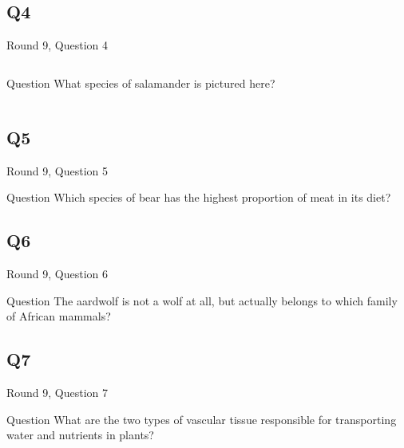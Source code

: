 \documentclass[11pt]{beamer}
\begin{document}
\subsection*{Q4}
\begin{frame}[t]{Round 9, Question 4}
\begin{columns}[T,totalwidth=\linewidth]
\begin{column}{0.32\linewidth}
\begin{block}{Question}
What species of salamander is pictured here?
\end{block}
\end{column}
\begin{column}{0.65\linewidth}
\begin{center}
\texttt{[image: \{Images/axolotl]}.jpg}
\end{center}
\end{column}
\end{columns}
\end{frame}
\subsection*{Q5}
\begin{frame}[t]{Round 9, Question 5}
\begin{block}{Question}
Which species of bear has the highest proportion of meat in its diet?
\end{block}
\end{frame}
\subsection*{Q6}
\begin{frame}[t]{Round 9, Question 6}
\begin{block}{Question}
The aardwolf is not a wolf at all, but actually belongs to which family of African mammals?
\end{block}
\end{frame}
\subsection*{Q7}
\begin{frame}[t]{Round 9, Question 7}
\begin{block}{Question}
What are the two types of vascular tissue responsible for transporting water and nutrients in plants?
\end{block}
\end{frame}
\end{document}
